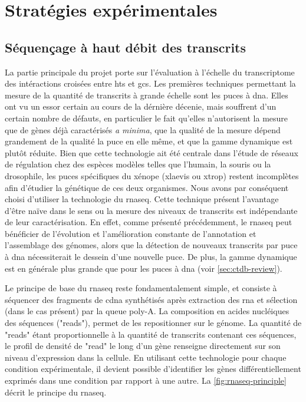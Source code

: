 \chapter{Stratégies expérimentales}


\section{Séquençage à haut débit des transcrits}

La partie principale du projet porte sur l'évaluation à l'échelle du transcriptome des intéractions croisées entre \glspl{ht} et \glspl{gc}.
Les premières techniques permettant la mesure de la quantité de transcrits à grande échelle sont les puces à \gls{dna}.
Elles ont vu un essor certain au cours de la dérnière décenie, mais souffrent d'un certain nombre de défauts, en particulier le fait qu'elles n'autorisent la mesure que de gènes déjà caractérisés \textit{a minima}, que la qualité de la mesure dépend grandement de la qualité la puce en elle même, et que la gamme dynamique est plutôt réduite.
Bien que cette technologie ait été centrale dans l'étude de réseaux de régulation chez des espèces modèles telles que l'humain, la souris ou la drosophile, les puces spécifiques du xénope (\gls{xlaevis} ou \gls{xtrop}) restent incomplètes afin d'étudier la génétique de ces deux organismes.
Nous avons par conséquent choisi d'utiliser la technologie du \gls{rnaseq}.
Cette technique présent l'avantage d'être naïve dans le sens ou la mesure des niveaux de transcrits est indépendante de leur caractérisation.
En effet, comme présenté précédemment, le \gls{rnaseq} peut bénéficier de l'évolution et l'amélioration constante de l'annotation et l'assemblage des génomes, alors que la détection de nouveaux transcrits par puce à \gls{dna} nécessiterait le dessein d'une nouvelle puce.
De plus, la gamme dynamique est en générale plus grande que pour les puces à \gls{dna} (voir \autoref{sec:ctdb-review}).



Le principe de base du \gls{rnaseq} reste fondamentalement simple, et consiste à séquencer des fragments de \gls{cdna} synthétisés après extraction des \gls{rna} et sélection (dans le cas présent) par la queue poly-A.
La composition en acides nucléiques des séquences ("reads"), permet de les repositionner sur le génome.
La quantité de "reads" étant proportionnelle à la quantité de transcrits contenant ces séquences, le profil de densité de "read" le long d'un gène renseigne directement sur son niveau d'expression dans la cellule.
En utilisant cette technologie pour chaque condition expérimentale, il devient possible d'identifier les gènes différentiellement exprimés dans une condition par rapport à une autre.
La \autoref{fig:rnaseq-principle} décrit le principe du \gls{rnaseq}.

